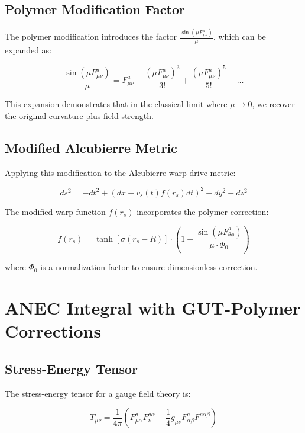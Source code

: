 \documentclass[11pt]{article}
\begin{document}
\subsection{Polymer Modification Factor}

The polymer modification introduces the factor $\frac{\sin(\mu F^a_{\mu\nu})}{\mu}$, which can be expanded as:

\begin{equation}
\frac{\sin(\mu F^a_{\mu\nu})}{\mu} = F^a_{\mu\nu} - \frac{(\mu F^a_{\mu\nu})^3}{3!} + \frac{(\mu F^a_{\mu\nu})^5}{5!} - \ldots
\end{equation}

This expansion demonstrates that in the classical limit where $\mu \to 0$, we recover the original curvature plus field strength.

\subsection{Modified Alcubierre Metric}

Applying this modification to the Alcubierre warp drive metric:

\begin{equation}
ds^2 = -dt^2 + (dx - v_s(t) f(r_s) dt)^2 + dy^2 + dz^2
\end{equation}

The modified warp function $f(r_s)$ incorporates the polymer correction:

\begin{equation}
f(r_s) = \tanh[\sigma(r_s - R)] \cdot \left(1 + \frac{\sin(\mu F^a_{\theta\phi})}{\mu \cdot \Phi_0}\right)
\end{equation}

where $\Phi_0$ is a normalization factor to ensure dimensionless correction.

\section{ANEC Integral with GUT-Polymer Corrections}

\subsection{Stress-Energy Tensor}

The stress-energy tensor for a gauge field theory is:

\begin{equation}
T_{\mu\nu} = \frac{1}{4\pi}\left(F^a_{\mu\alpha}F^{a\alpha}_{\nu} - \frac{1}{4}g_{\mu\nu}F^a_{\alpha\beta}F^{a\alpha\beta}\right)
\end{equation}
\end{document}
